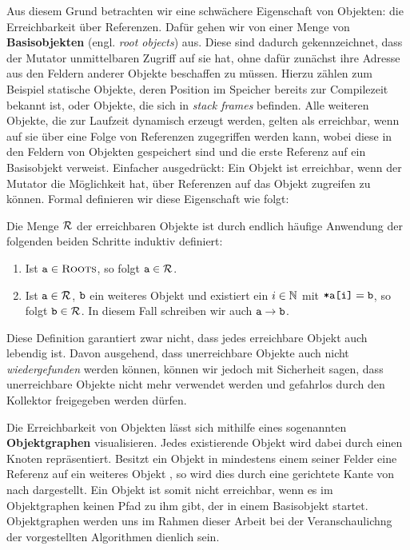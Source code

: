 Aus diesem Grund betrachten wir eine schwächere Eigenschaft von Objekten: die Erreichbarkeit über Referenzen.
Dafür gehen wir von einer Menge \Roots von \textbf{Basisobjekten} (engl. \textit{root objects}) aus.
Diese sind dadurch gekennzeichnet, dass der Mutator unmittelbaren Zugriff auf sie hat, ohne dafür zunächst ihre Adresse aus den Feldern anderer Objekte beschaffen zu müssen.
Hierzu zählen zum Beispiel statische Objekte, deren Position im Speicher bereits zur Compilezeit bekannt ist, oder Objekte, die sich in \textit{stack frames} befinden.
Alle weiteren Objekte, die zur Laufzeit dynamisch erzeugt werden, gelten als erreichbar, wenn auf sie über eine Folge von Referenzen zugegriffen werden kann, wobei diese in den Feldern von Objekten gespeichert sind und die erste Referenz auf ein Basisobjekt verweist.
Einfacher ausgedrückt: Ein Objekt ist erreichbar, wenn der Mutator die Möglichkeit hat, über Referenzen auf das Objekt zugreifen zu können.
Formal definieren wir diese Eigenschaft wie folgt:

\begin{mybox}
\begin{defn}[Erreichbarkeit]
	\label{def:erreichbar}
	Die Menge $\mathcal{R}$ der erreichbaren Objekte ist durch endlich häufige Anwendung der folgenden beiden Schritte induktiv definiert:
	\begin{enumerate}[(1)]
		\item Ist $\texttt{a} \in \textsc{Roots}$, so folgt $\texttt{a} \in \mathcal{R}$.
		\item Ist $\texttt{a} \in \mathcal{R}$, $\texttt{b}$ ein weiteres Objekt und existiert ein $i \in \mathbb{N}$ mit $\texttt{*a[i]} = \texttt{b}$, so folgt $\texttt{b} \in \mathcal{R}$.
		In diesem Fall schreiben wir auch $\texttt{a} \rightarrow \texttt{b}$.
	\end{enumerate}
\end{defn}
\end{mybox}

Diese Definition garantiert zwar nicht, dass jedes erreichbare Objekt auch lebendig ist.
Davon ausgehend, dass unerreichbare Objekte auch nicht \textit{wiedergefunden} werden können, können wir jedoch mit Sicherheit sagen, dass unerreichbare Objekte nicht mehr verwendet werden und gefahrlos durch den Kollektor freigegeben werden dürfen.

Die Erreichbarkeit von Objekten lässt sich mithilfe eines sogenannten \textbf{Objektgraphen} visualisieren.
Jedes existierende Objekt wird dabei durch einen Knoten repräsentiert.
Besitzt ein Objekt  in mindestens einem seiner Felder eine Referenz auf ein weiteres Objekt , so wird dies durch eine gerichtete Kante von  nach  dargestellt.
Ein Objekt ist somit nicht erreichbar, wenn es im Objektgraphen keinen Pfad zu ihm gibt, der in einem Basisobjekt startet.
Objektgraphen werden uns im Rahmen dieser Arbeit bei der Veranschaulichng der vorgestellten Algorithmen dienlich sein.

